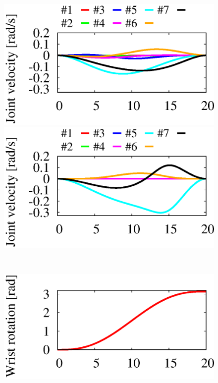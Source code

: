 %
\begin{figure}[t]
  \centering
  \begin{minipage}[h]{0.40\linewidth}
    \includegraphics[width=1.0\linewidth]{fig/chapter4/inspection/case1/RL-M/U01_joint_velo.eps}
  \end{minipage}
  \begin{minipage}[h]{0.40\linewidth}
    \includegraphics[width=1.0\linewidth]{fig/chapter4/inspection/case1/CONV/U01_joint_velo.eps}
  \end{minipage}\\
  \vspace{-5mm}
  \begin{minipage}[h]{0.40\linewidth}
    \includegraphics[width=1.0\linewidth]{fig/chapter4/inspection/case1/RL-M/U12_rotation_angle.eps}

\end{minipage}
\end{figure}
